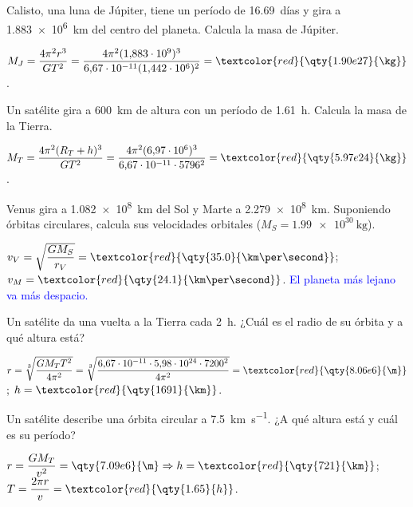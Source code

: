 \begin{exercise}
    Calisto, una luna de Júpiter, tiene un período de \qty{16.69}{días} y gira a \qty{1.883e6}{\km} del centro del planeta.
    Calcula la masa de Júpiter.
    \begin{solu}
        \(M_J = \dfrac{4\pi^2 r^3}{G T^2} = \dfrac{4\pi^2(1{,}883\cdot 10^9)^3}{6{,}67\cdot 10^{-11}(1{,}442\cdot 10^6)^2} = \textcolor{red}{\qty{1.90e27}{\kg}}\).
    \end{solu}
\end{exercise}

\begin{exercise}
    Un satélite gira a \qty{600}{\km} de altura con un período de \qty{1.61}{h}. Calcula la masa de la Tierra.
    \begin{solu}
        \(M_T = \dfrac{4\pi^2 (R_T + h)^3}{G T^2} = \dfrac{4\pi^2(6{,}97\cdot 10^6)^3}{6{,}67\cdot 10^{-11}\cdot 5796^2} = \textcolor{red}{\qty{5.97e24}{\kg}}\).
    \end{solu}
\end{exercise}

\begin{exercise}
    Venus gira a \qty{1.082e8}{\km} del Sol y Marte a \qty{2.279e8}{\km}. Suponiendo órbitas circulares, calcula sus velocidades
    orbitales (\(M_S = \qty{1.99e30}{\kg}\)).
    \begin{solu}
        \(v_V = \sqrt{\dfrac{G M_S}{r_V}} = \textcolor{red}{\qty{35.0}{\km\per\second}}\); \(v_M = \textcolor{red}{\qty{24.1}{\km\per\second}}\).
        \textcolor{blue}{El planeta más lejano va más despacio.}
    \end{solu}
\end{exercise}

\begin{exercise}
    Un satélite da una vuelta a la Tierra cada \qty{2}{h}. ¿Cuál es el radio de su órbita y a qué altura está?
    \begin{solu}
        \(r = \sqrt[3]{\dfrac{G M_T T^2}{4\pi^2}} = \sqrt[3]{\dfrac{6{,}67\cdot 10^{-11}\cdot 5{,}98\cdot 10^{24}\cdot 7200^2}{4\pi^2}} = \textcolor{red}{\qty{8.06e6}{\m}}\);
        \(h = \textcolor{red}{\qty{1691}{\km}}\).
    \end{solu}
\end{exercise}

\begin{exercise}
    Un satélite describe una órbita circular a \qty{7.5}{\km\per\second}. ¿A qué altura está y cuál es su período?
    \begin{solu}
        \(r = \dfrac{G M_T}{v^2} = \qty{7.09e6}{\m} \Rightarrow h = \textcolor{red}{\qty{721}{\km}}\);
        \(T = \dfrac{2\pi r}{v} = \textcolor{red}{\qty{1.65}{h}}\).
    \end{solu}
\end{exercise}

